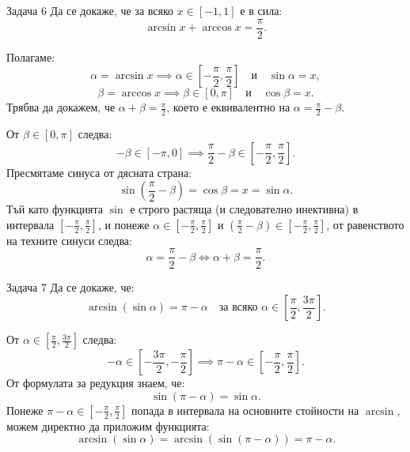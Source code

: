 \vspace{1em}

\begin{problembox}{Задача 6}
Да се докаже, че за всяко $x \in [-1, 1]$ е в сила:
\[
\arcsin x + \arccos x = \frac{\pi}{2}.
\]
\end{problembox}

\begin{solution}
Полагаме:
\[
\alpha = \arcsin x \implies \alpha \in \left[-\frac{\pi}{2}, \frac{\pi}{2}\right] \quad \text{и} \quad \sin \alpha = x,
\]
\[
\beta = \arccos x \implies \beta \in [0, \pi] \quad \text{и} \quad \cos \beta = x.
\]
Трябва да докажем, че $\alpha + \beta = \frac{\pi}{2}$, което е еквивалентно на $\alpha = \frac{\pi}{2} - \beta$.

От $\beta \in [0, \pi]$ следва:
\[
-\beta \in [-\pi, 0] \implies \frac{\pi}{2} - \beta \in \left[-\frac{\pi}{2}, \frac{\pi}{2}\right].
\]
Пресмятаме синуса от дясната страна:
\[
\sin\left(\frac{\pi}{2} - \beta\right) = \cos \beta = x = \sin \alpha.
\]
Тъй като функцията $\sin$ е строго растяща (и следователно инективна) в интервала $\left[-\frac{\pi}{2}, \frac{\pi}{2}\right]$, и понеже $\alpha \in \left[-\frac{\pi}{2}, \frac{\pi}{2}\right]$ и $\left(\frac{\pi}{2} - \beta\right) \in \left[-\frac{\pi}{2}, \frac{\pi}{2}\right]$, от равенството на техните синуси следва:
\[
\alpha = \frac{\pi}{2} - \beta \iff \alpha + \beta = \frac{\pi}{2}.
\]
\end{solution}

\vspace{1em}

\begin{problembox}{Задача 7}
Да се докаже, че:
\[
\arcsin(\sin \alpha) = \pi - \alpha \quad \text{за всяко } \alpha \in \left[\frac{\pi}{2}, \frac{3\pi}{2}\right].
\]
\end{problembox}

\begin{solution}
От $\alpha \in \left[\frac{\pi}{2}, \frac{3\pi}{2}\right]$ следва:
\[
-\alpha \in \left[-\frac{3\pi}{2}, -\frac{\pi}{2}\right] \implies \pi - \alpha \in \left[-\frac{\pi}{2}, \frac{\pi}{2}\right].
\]
От формулата за редукция знаем, че:
\[
\sin(\pi - \alpha) = \sin \alpha.
\]
Понеже $\pi - \alpha \in \left[-\frac{\pi}{2}, \frac{\pi}{2}\right]$ попада в интервала на основните стойности на $\arcsin$, можем директно да приложим функцията:
\[
\arcsin(\sin \alpha) = \arcsin(\sin(\pi - \alpha)) = \pi - \alpha.
\]
\end{solution}

